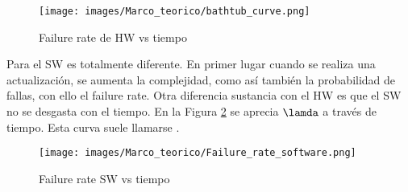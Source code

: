 \begin{figure}[h]
 \centering
 \texttt{[image: images/Marco\_teorico/bathtub\_curve.png]}
  \caption{Failure rate de HW vs tiempo }
\label{fig:bathtub_curve}
\end{figure}

Para el \ac{SW} es totalmente diferente. En primer lugar cuando se realiza una actualización, se aumenta la complejidad, como así también la probabilidad de fallas,
con ello el failure rate. Otra diferencia sustancia con el \ac{HW} es que el \ac{SW} no se desgasta con el tiempo. En la Figura \ref{fig:Failure_rate_software}
se aprecia $\lamda$ a través de tiempo. Esta curva suele llamarse .

\begin{figure}[h]
 \centering
 \texttt{[image: images/Marco\_teorico/Failure\_rate\_software.png]}
  \caption{Failure rate SW vs tiempo }
\label{fig:Failure_rate_software}
\end{figure}
